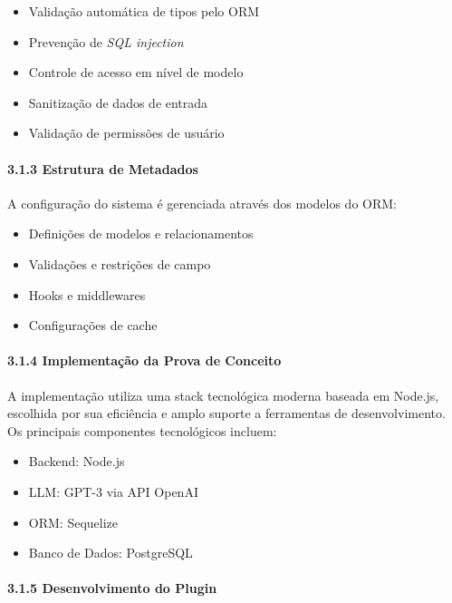 \documentclass[
]{article}
\providecommand{\tightlist}{%
  \setlength{\itemsep}{0pt}\setlength{\parskip}{0pt}}
\begin{document}
\begin{itemize}
\tightlist
\item
  Validação automática de tipos pelo ORM
\item
  Prevenção de \emph{SQL injection}
\item
  Controle de acesso em nível de modelo
\item
  Sanitização de dados de entrada
\item
  Validação de permissões de usuário
\end{itemize}

\paragraph{3.1.3 Estrutura de Metadados}\label{estrutura-de-metadados}

A configuração do sistema é gerenciada através dos modelos do ORM:

\begin{itemize}
\tightlist
\item
  Definições de modelos e relacionamentos
\item
  Validações e restrições de campo
\item
  Hooks e middlewares
\item
  Configurações de cache
\end{itemize}

\paragraph{3.1.4 Implementação da Prova de
Conceito}\label{implementauxe7uxe3o-da-prova-de-conceito}

A implementação utiliza uma stack tecnológica moderna baseada em
Node.js, escolhida por sua eficiência e amplo suporte a ferramentas de
desenvolvimento. Os principais componentes tecnológicos incluem:

\begin{itemize}
\tightlist
\item
  Backend: Node.js
\item
  LLM: GPT-3 via API OpenAI
\item
  ORM: Sequelize
\item
  Banco de Dados: PostgreSQL
\end{itemize}

\paragraph{3.1.5 Desenvolvimento do
Plugin}\label{desenvolvimento-do-plugin}
\end{document}
